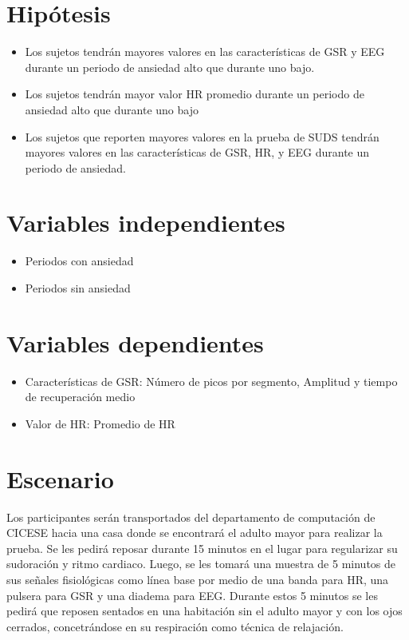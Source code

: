 \section{Hip\'otesis}
	\begin{itemize}
	\item{Los sujetos tendr\'an mayores valores en las caracter\'isticas de GSR y EEG durante un periodo de ansiedad alto que durante uno bajo.}
	\item{Los sujetos tendr\'an mayor valor HR promedio durante un periodo de ansiedad alto que durante uno bajo}
	\item{Los sujetos que reporten mayores valores en la prueba de SUDS tendr\'an mayores valores en las caracter\'isticas de GSR, HR, y EEG durante un periodo de ansiedad.}
	\end{itemize}
\section{Variables independientes}
	\begin{itemize}
		\item{Periodos con ansiedad}
		\item{Periodos sin ansiedad}
	\end{itemize}
\section{Variables dependientes}
	\begin{itemize}
		\item{Caracter\'isticas de GSR: N\'umero de picos por segmento, Amplitud y tiempo de recuperaci\'on medio}
		\item{Valor de HR: Promedio de HR}
	\end{itemize}
\section{Escenario}
	Los participantes ser\'an transportados del departamento de computaci\'on de CICESE hacia una casa donde se encontrar\'a el adulto mayor
	para realizar la prueba.
	Se les pedir\'a reposar durante 15 minutos en el lugar para regularizar su sudoraci\'on y ritmo cardiaco.
	Luego, se les tomar\'a una muestra de 5 minutos de sus se\~nales fisiol\'ogicas como l\'inea base por medio de una banda para HR, una pulsera para GSR y una diadema para EEG. Durante estos 5 minutos
	se les pedir\'a  que reposen sentados en una habitaci\'on sin el adulto mayor y con los ojos cerrados, concetr\'andose en su respiraci\'on como t\'ecnica de relajaci\'on.


